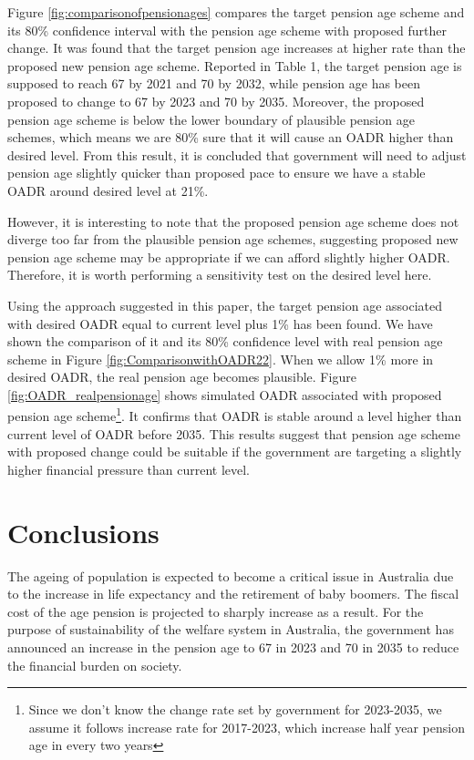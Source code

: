 \documentclass[11pt,a4paper,]{article}
\begin{document}
Figure \ref{fig:comparisonofpensionages} compares the target pension age
scheme and its 80\% confidence interval with the pension age scheme with
proposed further change. It was found that the target pension age
increases at higher rate than the proposed new pension age scheme.
Reported in Table 1, the target pension age is supposed to reach 67 by
2021 and 70 by 2032, while pension age has been proposed to change to 67
by 2023 and 70 by 2035. Moreover, the proposed pension age scheme is
below the lower boundary of plausible pension age schemes, which means
we are 80\% sure that it will cause an OADR higher than desired level.
From this result, it is concluded that government will need to adjust
pension age slightly quicker than proposed pace to ensure we have a
stable OADR around desired level at 21\%.

However, it is interesting to note that the proposed pension age scheme
does not diverge too far from the plausible pension age schemes,
suggesting proposed new pension age scheme may be appropriate if we can
afford slightly higher OADR. Therefore, it is worth performing a
sensitivity test on the desired level here.

Using the approach suggested in this paper, the target pension age
associated with desired OADR equal to current level plus 1\% has been
found. We have shown the comparison of it  and its
80\% confidence level with real pension age scheme in Figure
\ref{fig:ComparisonwithOADR22}. When we allow 1\% more in desired OADR,
the real pension age becomes plausible. Figure
\ref{fig:OADR_realpensionage} shows simulated OADR associated with
proposed pension age
scheme\footnote{Since we don't know the change rate set by government for 2023-2035, we assume it follows increase rate for 2017-2023, which increase half year pension age in every two years}.
It confirms that OADR is stable around a level higher than current level
of OADR before 2035. This results suggest that pension age scheme with
proposed change could be suitable if the government are targeting a
slightly higher financial pressure than current level.

\section{Conclusions}\label{sec:conclusions}

The ageing of population is expected to become a critical issue in
Australia due to the increase in life expectancy and the retirement of
baby boomers. The fiscal cost of the age pension is projected to sharply
increase as a result. For the purpose of sustainability of the welfare
system in Australia, the government has announced an increase in the
pension age to 67 in 2023 and 70 in 2035 to reduce the financial burden
on society.
\end{document}
